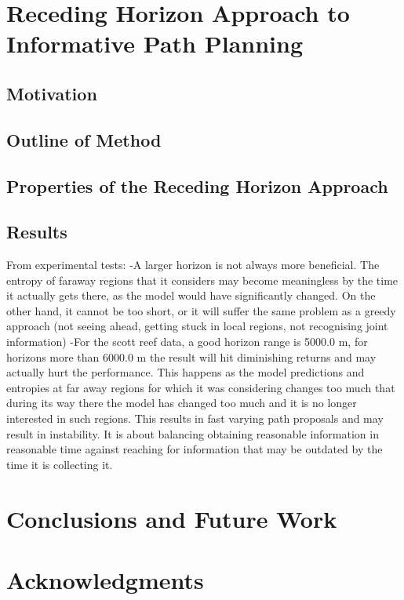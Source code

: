\documentclass{article}
\begin{document}
		

					
\section{Receding Horizon Approach to Informative Path Planning}
\label{Section:RecedingHorizonApproach}

	\subsection{Motivation}
	
	\subsection{Outline of Method}
	
	\subsection{Properties of the Receding Horizon Approach}
	
	\subsection{Results}
	
		From experimental tests:
			-A larger horizon is not always more beneficial. The entropy of faraway regions that it considers may become meaningless by the time it actually gets there, as the model would have significantly changed. On the other hand, it cannot be too short, or it will suffer the same problem as a greedy approach (not seeing ahead, getting stuck in local regions, not recognising joint information)
			-For the scott reef data, a good horizon range is 5000.0 m, for horizons more than 6000.0 m the result will hit diminishing returns and may actually hurt the performance. This happens as the model predictions and entropies at far away regions for which it was considering changes too much that during its way there the model has changed too much and it is no longer interested in such regions. This results in fast varying path proposals and may result in instability. It is about balancing obtaining reasonable information in reasonable time against reaching for information that may be outdated by the time it is collecting it.
			
		
\section{Conclusions and Future Work}
\label{Section:Conclusion}

\section*{Acknowledgments}


%
%



\end{document}
